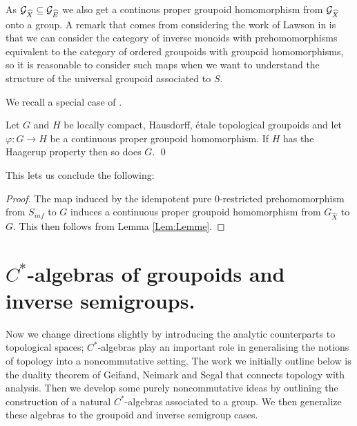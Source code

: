 As $\mathcal{G}_{\widehat{X}} \subseteq \mathcal{G}_{\widehat{E}}$ we also get a continous proper groupoid homomorphism from $\mathcal{G}_{\widehat{X}}$ onto a group.  A remark that comes from considering the work of Lawson in \cite{MR1694900} is that we can consider the category of inverse monoids with prehomomorphisms equivalent to the category of ordered groupoids with groupoid homomorphisms, so it is reasonable to consider such maps when we want to understand the structure of the universal groupoid associated to $S$. 

We recall a special case of \cite[Lemme 3.12]{MR1703305}.

\begin{lemma}\label{Lem:Lemme}
Let $G$ and $H$ be locally compact, Hausdorff, \'etale topological groupoids and let $\varphi: G \rightarrow H$ be a continuous proper groupoid homomorphism. If $H$ has the Haagerup property then so does $G$. \qed
\end{lemma}

This lets us conclude the following:
\begin{proof}
The map induced by the idempotent pure 0-restricted prehomomorphism from $S_{inf}$ to $G$ induces a continuous proper groupoid homomorphism from $G_{\widehat{X}}$ to $G$. This then follows from Lemma \ref{Lem:Lemme}.\end{proof}

\section{\texorpdfstring{$C^{*}$}{C*}-algebras of groupoids and inverse semigroups.}
Now we change directions slightly by introducing the analytic counterparts to topological spaces; $C^{*}$-algebras play an important role in generalising the notions of topology into a noncommutative setting. The work we initially outline below is the duality theorem of Geifand, Neimark and Segal that connects topology with analysis. Then we develop some purely noncommutative ideas by outlining the construction of a natural $C^{*}$-algebras associated to a group. We then generalize these algebras to the groupoid and inverse semigroup cases.

